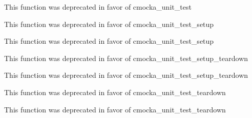 \begin{DoxyRefList}
\label{deprecated__deprecated000007}%
%
This function was deprecated in favor of cmocka\+\_\+unit\+\_\+test  
\item[Global \doxylink{group__cmocka__exec_gaf005639a9b71cced47ce4708e53912d9}{unit\+\_\+test\+\_\+setup} (test, setup)]\label{deprecated__deprecated000002}%
%
This function was deprecated in favor of cmocka\+\_\+unit\+\_\+test\+\_\+setup 

\label{deprecated__deprecated000008}%
%
This function was deprecated in favor of cmocka\+\_\+unit\+\_\+test\+\_\+setup  
\item[Global \doxylink{group__cmocka__exec_gaee80106db018434c00df4ba235415b26}{unit\+\_\+test\+\_\+setup\+\_\+teardown} (test, setup, teardown)]\label{deprecated__deprecated000006}%
%
This function was deprecated in favor of cmocka\+\_\+unit\+\_\+test\+\_\+setup\+\_\+teardown 

\label{deprecated__deprecated000012}%
%
This function was deprecated in favor of cmocka\+\_\+unit\+\_\+test\+\_\+setup\+\_\+teardown  
\item[Global \doxylink{group__cmocka__exec_ga3fe0f3c69fb85843701876937b7217f4}{unit\+\_\+test\+\_\+teardown} (test, teardown)]\label{deprecated__deprecated000003}%
%
This function was deprecated in favor of cmocka\+\_\+unit\+\_\+test\+\_\+teardown 

\label{deprecated__deprecated000009}%
%
This function was deprecated in favor of cmocka\+\_\+unit\+\_\+test\+\_\+teardown 
\end{DoxyRefList}